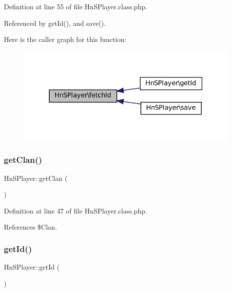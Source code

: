 Definition at line 55 of file Hn\+S\+Player.\+class.\+php.



Referenced by get\+Id(), and save().

Here is the caller graph for this function\+:\nopagebreak
\begin{figure}[H]
\begin{center}
\leavevmode
\includegraphics[width=315pt]{class_hn_s_player_a2db791a389d27e0bf349916089d07294_icgraph}
\end{center}
\end{figure}
\mbox{\label{class_hn_s_player_a5e34d30d1bb8bf76705af6bc9494985e}} 
\subsubsection{\texorpdfstring{get\+Clan()}{getClan()}}
{\footnotesize\ttfamily Hn\+S\+Player\+::get\+Clan (\begin{DoxyParamCaption}{ }\end{DoxyParamCaption})}



Definition at line 47 of file Hn\+S\+Player.\+class.\+php.



References \$\+Clan.

\mbox{\label{class_hn_s_player_ad3a3fcc2b75f6814fe25ad07f1c71b52}} 
\subsubsection{\texorpdfstring{get\+Id()}{getId()}}
{\footnotesize\ttfamily Hn\+S\+Player\+::get\+Id (\begin{DoxyParamCaption}{ }\end{DoxyParamCaption})}



